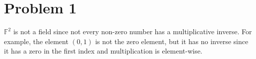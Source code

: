 \section{Problem 1}

$\mathbb{F}^2$ is not a field 
since not every non-zero number has a multiplicative inverse.
For example, the element $(0,1)$ is not the zero element, but
it has no inverse since it has a zero in the first index
and multiplication is element-wise.